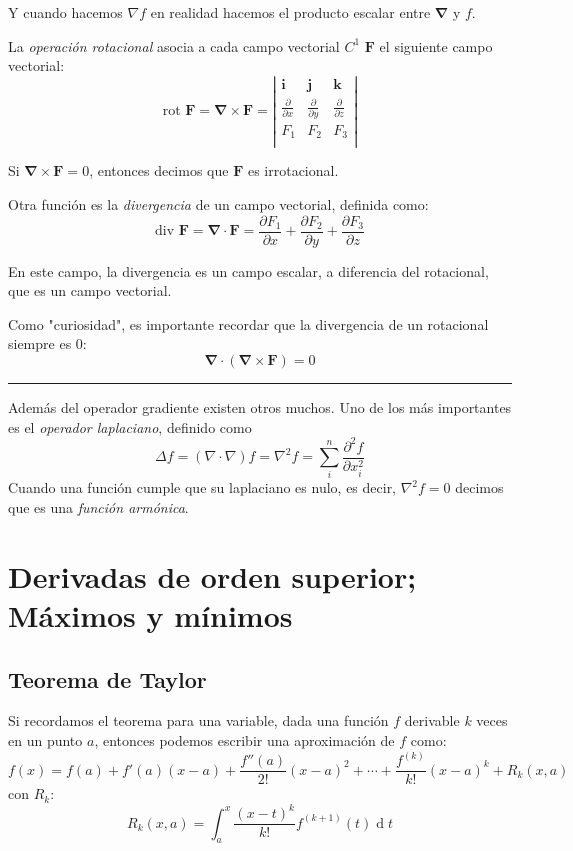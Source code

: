 \documentclass[a4paper]{article}
\renewcommand{\d}[1]{\ensuremath{\operatorname{d}\!{#1}}}
\begin{document}
Y cuando hacemos $\nabla f$ en realidad hacemos el producto escalar entre $\boldsymbol{\nabla} $ y $f$.

La \textit{operación rotacional} asocia a cada campo vectorial $C^1$ $\textbf{F}$ el siguiente campo vectorial:
\[ \text{rot } \textbf{F} = {\boldsymbol{\nabla}} \times \textbf{F} = \left| \begin{matrix}
\textbf{i} & \textbf{j} & \textbf{k} \\
\frac{\partial}{\partial x} & \frac{\partial}{\partial y}  & \frac{\partial}{\partial z}  \\
F_1 & F_2 & F_3 \\
\end{matrix}\right| 
\]

Si ${\boldsymbol{\nabla}} \times \textbf{F}=0$, entonces decimos que $\textbf{F}$ es irrotacional.

Otra función es la \textit{divergencia} de un campo vectorial, definida como:
\[  \text{div } \textbf{F} = {\boldsymbol{\nabla}} \cdot \textbf{F} = \frac{\partial F_1}{\partial x} + \frac{\partial F_2}{\partial y} + \frac{\partial F_3}{\partial z} \]

En este campo, la divergencia es un campo escalar, a diferencia del rotacional, que es un campo vectorial.

Como "curiosidad", es importante recordar que la divergencia de un rotacional siempre es 0: 
\[ {\boldsymbol{\nabla}} \cdot ({\boldsymbol{\nabla}} \times \textbf{F}) = 0\] 

\rule{\linewidth}{1pt}

Además del operador gradiente existen otros muchos. Uno de los más importantes es el \textit{operador laplaciano}, definido como
\[ \Delta f = (\nabla\cdot\nabla)f = \nabla^2f = \sum^n_i\frac{\partial^2f}{\partial x_i^2} \]
Cuando una función cumple que su laplaciano es nulo, es decir, $\nabla^2f = 0$ decimos que es una \textit{función armónica}.
\section{Derivadas de orden superior; Máximos y mínimos}
\subsection{Teorema de Taylor}
Si recordamos el teorema para una variable, dada una función $f$ derivable $k$ veces en un punto $a$, entonces podemos escribir una aproximación de $f$ como:
\[ f(x) = f(a) + f'(a) (x-a) + \frac{f''(a)}{2!} (x-a)^2 + \cdots + \frac{f^{(k)}}{k!}(x-a)^k + R_k(x,a)\]
con $R_k$:
\[ R_k(x,a) = \int_a^x{\frac{(x-t)^k}{k!}f^{(k+1)}(t) \d t} \]
\end{document}
